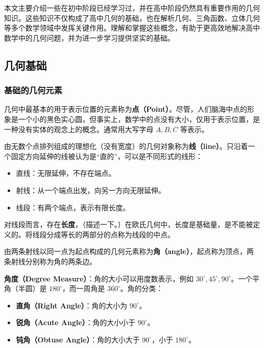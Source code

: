 
\begin{issues}
\issueDraft
\end{issues}

本文主要介绍一些在初中阶段已经学习过，并在高中阶段仍然具有重要作用的几何知识。这些知识不仅构成了高中几何的基础，也在解析几何、三角函数、立体几何等多个数学领域中发挥关键作用。理解和掌握这些概念，有助于更高效地解决高中数学中的几何问题，并为进一步学习提供坚实的基础。

\subsection{几何基础}

\subsubsection{基础的几何元素}

几何中最基本的用于表示位置的元素称为\textbf{点（Point）}。尽管，人们脑海中点的形象是一个小的黑色实心圆，但事实上，数学中的点没有大小，仅用于表示位置，是一种没有实体的观念上的概念。通常用大写字母 $A, B, C$ 等表示。

由无数个点排列组成的理想化（没有宽度）的几何对象称为\textbf{线（line）}。只沿着一个固定方向延伸的线被认为是“直的”，可以是不同形式的线形：
\begin{itemize}
\item 直线：无限延伸，不存在端点。
\item 射线：从一个端点出发，向另一方向无限延伸。
\item 线段：有两个端点，表示有限长度。
\end{itemize}

对线段而言，存在\textbf{长度}，（描述一下。）在欧氏几何中，长度是基础量，是不能被定义的。将线段分成等长的两部分的点称为线段的中点。

由两条射线以同一点为起点构成的几何元素称为\textbf{角（angle）}，起点称为顶点，两条射线分别称为角的两条边。

\textbf{角度（Degree Measure）}：角的大小可以用度数表示，例如 $30^\circ, 45^\circ, 90^\circ$。一个平角（半圆）是 $180^\circ$，而一周角是 $360^\circ$。角的分类：
\begin{itemize}
    \item \textbf{直角（Right Angle）}：角的大小为 $90^\circ$。
    \item \textbf{锐角（Acute Angle）}：角的大小小于 $90^\circ$。
    \item \textbf{钝角（Obtuse Angle）}：角的大小大于 $90^\circ$，小于 $180^\circ$。
\end{itemize}

